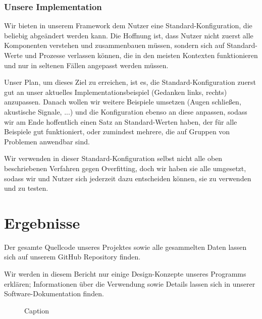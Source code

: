 \documentclass[10pt]{article}
\begin{document}
\subsubsection{Unsere Implementation}

Wir bieten in unserem Framework dem Nutzer eine Standard-Konfiguration, die beliebig abgeändert werden kann.
Die Hoffnung ist, dass Nutzer nicht zuerst alle Komponenten verstehen und zusammenbauen müssen, sondern sich auf Standard-Werte und Prozesse verlassen können, die in den meisten Kontexten funktionieren und nur in seltenen Fällen angepasst werden müssen.

Unser Plan, um dieses Ziel zu erreichen, ist es, die Standard-Konfiguration zuerst gut an unser aktuelles Implementationsbeispiel (Gedanken links, rechts) anzupassen.
Danach wollen wir weitere Beispiele umsetzen (Augen schließen, akustische Signale, ...) und die Konfiguration ebenso an diese anpassen, sodass wir am Ende hoffentlich einen Satz an Standard-Werten haben, der für alle Beispiele gut funktioniert, oder zumindest mehrere, die auf Gruppen von Problemen anwendbar sind.

Wir verwenden in dieser Standard-Konfiguration selbst nicht alle oben beschriebenen Verfahren gegen Overfitting, doch wir haben sie alle umgesetzt, sodass wir und Nutzer sich jederzeit dazu entscheiden können, sie zu verwenden und zu testen.

\section{Ergebnisse}

Der gesamte Quellcode unseres Projektes sowie alle gesammelten Daten lassen sich auf unserem GitHub Repository \cite{InterpretingEEG} finden.

Wir werden in diesem Bericht nur einige Design-Konzepte unseres Programms erklären; Informationen über die Verwendung sowie Details lassen sich in unserer Software-Dokumentation \cite{BCIInterfaceDocs} finden. 

\begin{figure}
    \centering
    \caption{Caption}
    \label{fig:my_label}
\end{figure}
\end{document}
